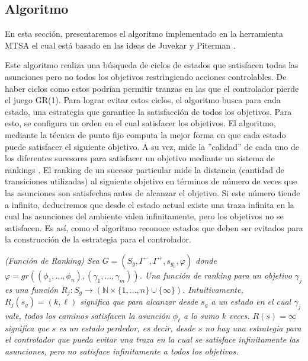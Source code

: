 \subsection{Algoritmo}

En esta sección, presentaremos el algoritmo implementado en la herramienta MTSA \cite{4639371} el cual está basado en las
ideas de Juvekar y Piterman \cite{Juvekar:buchi}.

Este algoritmo realiza una búsqueda de ciclos de estados que satisfacen todas las asunciones pero no todos los objetivos
restringiendo acciones controlables. De haber ciclos como estos podrían permitir tranzas en las que el controlador
pierde el juego GR(1). Para lograr evitar estos ciclos, el algoritmo busca para cada estado, una estrategia que
garantice la satisfacción de todos los objetivos. Para esto, se configura un orden en el cual satisfacer los objetivos.
El algoritmo, mediante la técnica de punto fijo computa la mejor forma en que cada estado puede satisfacer el siguiente
objetivo. A su vez, mide la ''calidad'' de cada uno de los diferentes sucesores para satisfacer un objetivo mediante un
sistema de rankings \cite{Jurdzinski:ParityGames}. El ranking de un sucesor particular mide la distancia (cantidad de transiciones utilizadas)
al siguiente objetivo en términos de número de veces que las asunciones son satisfechas antes de alcanzar el objetivo.
Si este número tiende a infinito, deduciremos que desde el estado actual existe una traza infinita en la cual las
asunciones del ambiente valen infinitamente, pero los objetivos no se satisfacen. Es así, como el algoritmo reconoce
estados que deben ser evitados para la construcción de la estrategia para el controlador.

\begin{nahaDef}
    \emph{(Función de Ranking) Sea $G = (S_g,\Gamma^-,\Gamma^+,s_{g_0},\varphi)$ donde $\varphi = 
    gr(( \phi_1 ,..., \phi_n ),( \gamma_1 ,..., \gamma_m ) )$. Una función de ranking para un objetivo $\gamma_j$ es una función
    $R_j : S_g \rightarrow (\mathbb{N} \times \{1,...,n\}\cup\{\infty\})$. Intuitivamente, $R_j(s_g) = (k,\ell)$
    significa que para alcanzar desde $s_g$ a un estado en el cual $\gamma_j$ vale, todos los caminos satisfacen
    la asunción $\phi_{\ell}$ a lo sumo $k$ veces. $R(s) = \infty$ significa que $s$ es un estado perdedor, es decir,
    desde $s$ no hay una estrategia para el controlador que pueda evitar una traza en la cual se satisface infinitamente
    las asunciones, pero no satisface infinitamente a todos los objetivos.}
\end{nahaDef}


